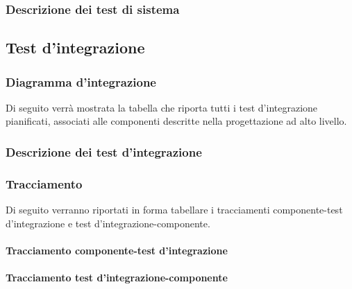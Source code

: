 \subsubsection{Descrizione dei test di sistema}


\subsection{Test d'integrazione}

\subsubsection{Diagramma d'integrazione}
Di seguito verrà mostrata la tabella che riporta tutti i test d'integrazione pianificati, associati alle componenti descritte nella progettazione ad alto livello.\\

\subsubsection{Descrizione dei test d'integrazione}


\subsubsection{Tracciamento}
Di seguito verranno riportati in forma tabellare i tracciamenti componente-test d'integrazione e test d'integrazione-componente.\\

\paragraph{Tracciamento componente-test d'integrazione}


\vspace{5cm}

\paragraph{Tracciamento test d'integrazione-componente}


